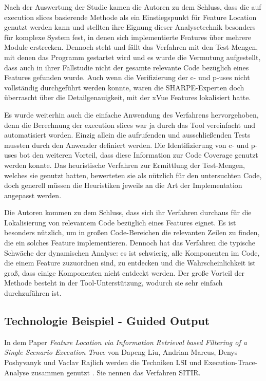 \documentclass[runningheads,a4paper]{llncs}
\begin{document}
Nach der Auswertung der Studie kamen die Autoren zu dem Schluss, dass die auf execution slices basierende Methode als ein Einstiegspunkt für Feature Location genutzt werden kann und stellten ihre Eignung dieser Analysetechnik besonders für komplexe System fest, in denen sich implementierte Features über mehrere Module erstrecken. Dennoch steht und fällt das Verfahren mit den Test-Mengen, mit denen das Programm gestartet wird und es wurde die Vermutung aufgestellt, dass auch in ihrer Fallstudie nicht der gesamte relevante Code bezüglich eines Features gefunden wurde. Auch wenn die Verifizierung der c- und p-uses nicht vollständig durchgeführt werden konnte, waren die SHARPE-Experten doch überrascht über die Detailgenauigkeit, mit der xVue Features lokalisiert hatte.

Es wurde weiterhin auch die einfache Anwendung des Verfahrens hervorgehoben, denn die Berechnung der execution slices war ja durch das Tool vereinfacht und automatisiert worden. Einzig allein die aufrufenden und ausschließenden Tests mussten durch den Anwender definiert werden. Die Identifizierung von c- und p-uses bot den weiteren Vorteil, dass diese Information zur Code Coverage genutzt werden konnte. Das heuristische Verfahren zur Ermittlung der Test-Mengen, welches sie genutzt hatten, bewerteten sie als nützlich für den untersuchten Code, doch generell müssen die Heuristiken jeweils an die Art der Implementation angepasst werden.

Die Autoren kommen zu dem Schluss, dass sich ihr Verfahren durchaus für die Lokalisierung von relevantem Code bezüglich eines Features eignet. Es ist besonders nützlich, um in großen Code-Bereichen die relevanten Zeilen zu finden, die ein solches Feature implementieren. Dennoch hat das Verfahren die typische Schwäche der dynamischen Analyse: es ist schwierig, alle Komponenten im Code, die einem Feature zuzuordnen sind, zu entdecken und die Wahrscheinlichkeit ist groß, dass einige Komponenten nicht entdeckt werden. Der große Vorteil der Methode besteht in der Tool-Unterstützung, wodurch sie sehr einfach durchzuführen ist. 

\subsection*{Technologie Beispiel - Guided Output}

In dem Paper \textit{Feature Location via Information Retrieval based Filtering of a Single Scenario Execution Trace} von Dapeng Liu, Andrian Marcus, Denys Poshyvanyk und Vaclav Rajlich werden die Techniken \ac{LSI} und Execution-Trace-Analyse zusammen genutzt \cite{DynmicGuided}. Sie nennen das Verfahren \ac{SITIR}.
\end{document}
